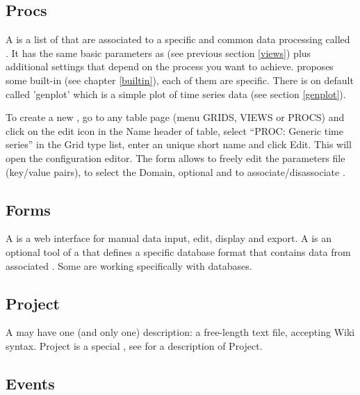 \subsection{Procs}
\label{procs}

A  is a list of  that are associated to a specific and common data processing called . It has the same basic parameters as  (see previous section \ref{views}) plus additional settings that depend on the process you want to achieve. \webobs proposes some built-in  (see chapter \ref{builtin}), each of them are specific. There is on default  called 'genplot' which is a simple plot of time series data (see section \ref{genplot}).

To create a new , go to any  table page (menu GRIDS, VIEWS or PROCS) and click on the edit icon in the Name header of table, select ``PROC: Generic time series'' in the Grid type list, enter an unique short name and click Edit. This will open the  configuration editor. The form allows to freely edit the parameters file (key/value pairs), to select the Domain, optional  and to associate/disassociate .


\subsection{Forms}
\label{forms}

A  is a web interface for manual data input, edit, display and export. A  is an optional tool of a  that defines a specific database format that contains data from associated . Some  are working specifically with  databases.

\subsection{Project}

A  may have one (and only one)  description: a free-length text file, accepting Wiki syntax. Project is a special , see  for
a description of Project.

\subsection{Events}

